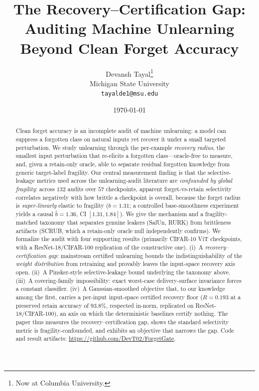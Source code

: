 \documentclass[11pt]{article}
\title{\textbf{The Recovery--Certification Gap:\\ Auditing Machine Unlearning Beyond Clean Forget Accuracy}}
\author{
  Devansh Tayal\thanks{Now at Columbia University.}\\
  \normalsize Michigan State University\\
  \normalsize \texttt{tayalde1@msu.edu}
}
\date{\today}
\begin{document}
\maketitle

\begin{abstract}
Clean forget accuracy is an incomplete audit of machine unlearning: a model can suppress a forgotten class on natural inputs yet recover it under a small targeted perturbation. We study unlearning through the per-example \emph{recovery radius}, the smallest input perturbation that re-elicits a forgotten class---oracle-free to measure, and, given a retain-only oracle, able to separate residual forgotten knowledge from generic target-label fragility. Our central measurement finding is that the selective-leakage metrics used across the unlearning-audit literature are \emph{confounded by global fragility}: across $132$ audits over $57$ checkpoints, apparent forget-vs-retain selectivity correlates negatively with how brittle a checkpoint is overall, because the forget radius is \emph{super-linearly} elastic to fragility ($b{=}1.31$; a controlled base-smoothness experiment yields a causal $\hat b{=}1.36$, CI $[1.31,1.84]$). We give the mechanism and a fragility-matched taxonomy that separates genuine leakers (SalUn, RURK) from brittleness artifacts (SCRUB, which a retain-only oracle null independently confirms). We formalize the audit with four supporting results (primarily CIFAR-10 ViT checkpoints, with a ResNet-18/CIFAR-100 replication of the constructive one). (i)~A \emph{recovery--certification gap}: mainstream certified unlearning bounds the indistinguishability of the \emph{weight distribution} from retraining and provably leaves the input-space recovery axis open. (ii)~A Pinsker-style selective-leakage bound underlying the taxonomy above. (iii)~A covering-family impossibility: exact worst-case delivery-surface invariance forces a constant classifier. (iv)~A Gaussian-smoothed objective that, to our knowledge among the first, carries a per-input input-space certified recovery floor ($R{=}0.193$ at a preserved retain accuracy of $93.8\%$, respected in-norm, replicated on ResNet-18/CIFAR-100), an axis on which the deterministic baselines certify nothing. The paper thus measures the recovery--certification gap, shows the standard selectivity metric is fragility-confounded, and exhibits an objective that narrows the gap. Code and result artifacts: \url{https://github.com/DevT02/ForgetGate}.
\end{abstract}
\end{document}
